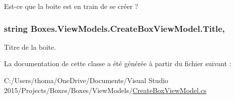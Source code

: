 Est-\/ce que la boite est en train de se créer ? 

\subsubsection[{\texorpdfstring{Title}{Title}}]{\setlength{\rightskip}{0pt plus 5cm}string Boxes.\+View\+Models.\+Create\+Box\+View\+Model.\+Title\hspace{0.3cm}{\ttfamily [get]}, {\ttfamily [set]}}\hypertarget{class_boxes_1_1_view_models_1_1_create_box_view_model_a65fa7ce73bfaff5493b1f01c9cb87709}{}\label{class_boxes_1_1_view_models_1_1_create_box_view_model_a65fa7ce73bfaff5493b1f01c9cb87709}


Titre de la boite. 



La documentation de cette classe a été générée à partir du fichier suivant \+:\begin{DoxyCompactItemize}
\item 
C\+:/\+Users/thoma/\+One\+Drive/\+Documents/\+Visual Studio 2015/\+Projects/\+Boxes/\+Boxes/\+View\+Models/\hyperlink{_create_box_view_model_8cs}{Create\+Box\+View\+Model.\+cs}\end{DoxyCompactItemize}
